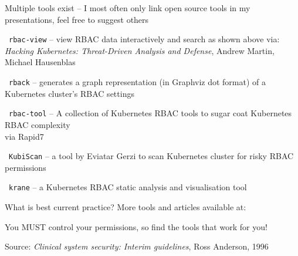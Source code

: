 \documentclass[Screen16to9,17pt]{foils}
\begin{document}






Multiple tools exist -- I most often only link open source tools in my presentations, feel free to suggest others
\begin{list2}
\item \faWrench\ \verb+rbac-view+ -- view RBAC data interactively and search as shown above
 via:\\
\emph{Hacking Kubernetes: Threat-Driven Analysis and Defense}, Andrew Martin, Michael Hausenblas

\item \faWrench\ \verb+rback+ -- generates a graph representation (in Graphviz dot format) of a Kubernetes cluster’s RBAC settings 

\item \faWrench\ \verb+rbac-tool+ -- A collection of Kubernetes RBAC tools to sugar coat Kubernetes RBAC complexity\\
 via Rapid7

\item \faWrench\ \verb+KubiScan+ -- a tool by Eviatar Gerzi to scan Kubernetes cluster for risky RBAC permissions 
\item \faWrench\ \verb+krane+ -- a Kubernetes RBAC static analysis and visualisation tool 

\item What is best current practice? More tools and articles available at:

\end{list2}

You MUST control your permissions, so find the tools that work for you!






Source:
\emph{Clinical system security: Interim guidelines}, Ross Anderson, 1996
\end{document}
